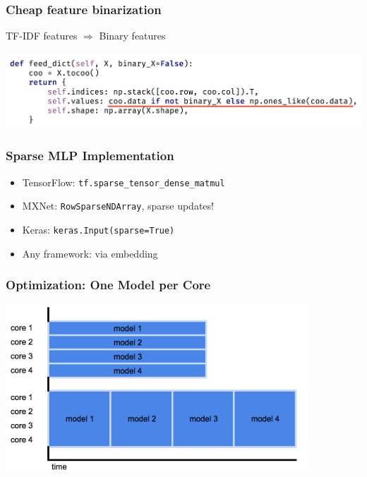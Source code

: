 \begin{frame}
    \frametitle{Cheap feature binarization}

    TF-IDF features $\Rightarrow$ Binary features

    \hspace{3cm}

    \includegraphics[width=1.0\textwidth]{img/binarization.png}

\end{frame}


\begin{frame}
    \frametitle{Sparse MLP Implementation}

    \begin{itemize}
        \item TensorFlow: \texttt{tf.sparse\_tensor\_dense\_matmul}
        \item MXNet: \texttt{RowSparseNDArray}, sparse updates!
        \item Keras: \texttt{keras.Input(sparse=True)}
        \item Any framework: via embedding
    \end{itemize}

\end{frame}

\begin{frame}
    \frametitle{Optimization: One Model per Core}

    \includegraphics[width=0.85\textwidth]{img/model_per_core.png}

\end{frame}

